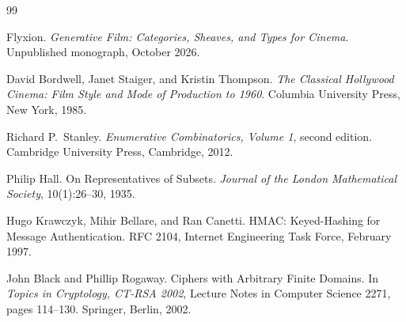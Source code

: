 \documentclass[11pt,twoside,openright]{book}
\theoremstyle{plain}
\theoremstyle{definition}
\theoremstyle{remark}
\begin{document}
\begin{thebibliography}{99}

Flyxion.
\newblock \emph{Generative Film: Categories, Sheaves, and Types for Cinema}.
\newblock Unpublished monograph, October 2026.

David Bordwell, Janet Staiger, and Kristin Thompson.
\newblock \emph{The Classical Hollywood Cinema: Film Style and Mode of Production to 1960}.
\newblock Columbia University Press, New York, 1985.

Richard P.\ Stanley.
\newblock \emph{Enumerative Combinatorics, Volume 1}, second edition.
\newblock Cambridge University Press, Cambridge, 2012.

Philip Hall.
\newblock On Representatives of Subsets.
\newblock \emph{Journal of the London Mathematical Society}, 10(1):26--30, 1935.

Hugo Krawczyk, Mihir Bellare, and Ran Canetti.
\newblock HMAC: Keyed-Hashing for Message Authentication.
\newblock RFC 2104, Internet Engineering Task Force, February 1997.

John Black and Phillip Rogaway.
\newblock Ciphers with Arbitrary Finite Domains.
\newblock In \emph{Topics in Cryptology, CT-RSA 2002}, Lecture Notes in Computer Science 2271, pages 114--130. Springer, Berlin, 2002.

\end{thebibliography}
\end{document}
